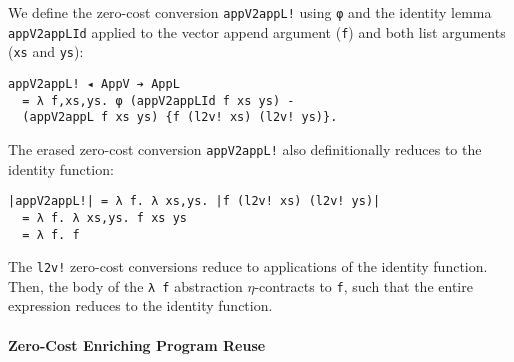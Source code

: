 \documentclass[acmsmall,screen]{acmart}
\begin{document}
We define the zero-cost conversion \verb;appV2appL!; using \verb;φ; and
the identity lemma \verb;appV2appLId; applied to the vector append
argument (\verb;f;) and both list arguments (\verb;xs; and \verb;ys;):
\begin{verbatim}
appV2appL! ◂ AppV ➔ AppL
  = λ f,xs,ys. φ (appV2appLId f xs ys) - 
  (appV2appL f xs ys) {f (l2v! xs) (l2v! ys)}.
\end{verbatim}
The erased zero-cost conversion \verb;appV2appL!; also definitionally
reduces to the identity function:
\begin{verbatim}
|appV2appL!| = λ f. λ xs,ys. |f (l2v! xs) (l2v! ys)|
  = λ f. λ xs,ys. f xs ys 
  = λ f. f
\end{verbatim}
The \verb;l2v!; zero-cost conversions reduce to applications of the
identity function. Then, the body of the \verb;λ f; abstraction
$\eta$-contracts to \verb;f;, such that the entire expression reduces
to the identity function.

\paragraph{Zero-Cost Enriching Program Reuse}
\end{document}
